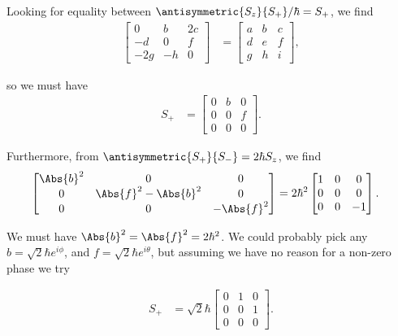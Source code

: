 Looking for equality between $\antisymmetric{S_{z}}{S_{+}}/\hbar = S_{+}$, we find
\begin{align}\label{eqn:desaiCh5:107}
\begin{bmatrix}
0 & b & 2 c \\
-d & 0 & f \\
-2g & -h & 0
\end{bmatrix}
&=
\begin{bmatrix}
a & b & c \\
d & e & f \\
g & h & i
\end{bmatrix},
\end{align}

so we must have
\begin{align}\label{eqn:desaiCh5:108}
S_{+} &=
\begin{bmatrix}
0 & b & 0 \\
0 & 0 & f \\
0 & 0 & 0
\end{bmatrix}.
\end{align}

Furthermore, from $\antisymmetric{S_{+}}{S_{-}} = 2 \hbar S_z$, we find
\begin{align}\label{eqn:desaiCh5:109}
\begin{bmatrix}
\Abs{b}^2 & 0 & 0 \\
0 & \Abs{f}^2 - \Abs{b}^2 & 0 \\
0 & 0 & -\Abs{f}^2 
\end{bmatrix}
&=
2 \hbar^2 
\begin{bmatrix}
1 & 0 & 0 \\
0 & 0 & 0 \\
0 & 0 & -1
\end{bmatrix}.
\end{align}

We must have $\Abs{b}^2 = \Abs{f}^2 = 2 \hbar^2$.  We could probably pick any 
$b = \sqrt{2} \hbar e^{i\phi}$, and $f = \sqrt{2} \hbar e^{i\theta}$, but assuming we have no reason for a non-zero phase we try

\begin{align}\label{eqn:desaiCh5:110}
S_{+} 
&= 
\sqrt{2} \hbar
\begin{bmatrix}
0 & 1 & 0 \\
0 & 0 & 1 \\
0 & 0 & 0
\end{bmatrix}.
\end{align}


